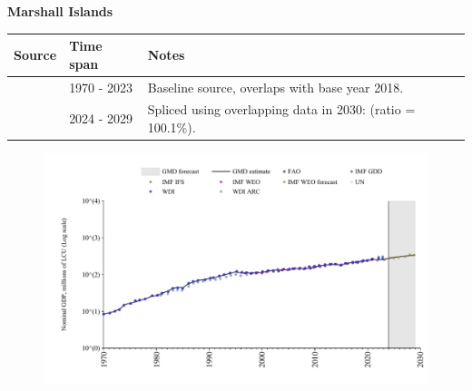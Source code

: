 \documentclass[12pt,a4paper,landscape]{article}
\begin{document}
\begin{adjustbox}{max totalsize={\paperwidth}{\paperheight},center}
\begin{minipage}[t][\textheight][t]{\textwidth}
\vspace*{0.5cm}
{}
\begin{center}
{\Large\bfseries Marshall Islands}
\end{center}
\vspace{0.5cm}
\begin{table}[H]
\centering
\small
\begin{tabular}{|l|l|l|}
\hline
\textbf{Source} & \textbf{Time span} & \textbf{Notes} \\
\hline
\rowcolor{white}\cite{WDI}& 1970 - 2023 &Baseline source, overlaps with base year 2018.\\
\rowcolor{lightgray}\cite{IMF_WEO_forecast}& 2024 - 2029 &Spliced using overlapping data in 2030: (ratio = 100.1\%).\\
\hline
\end{tabular}
\end{table}
\begin{figure}[H]
\centering
\includegraphics[width=\textwidth,height=0.6\textheight,keepaspectratio]{graphs/MHL_nGDP.pdf}
\end{figure}
\end{minipage}
\end{adjustbox}
\end{document}
